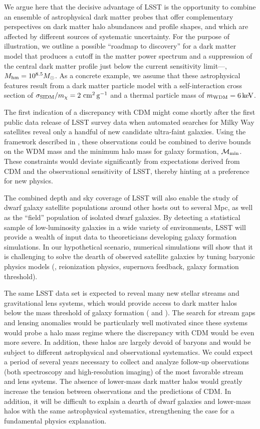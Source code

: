 We argue here that the decisive advantage of LSST is the opportunity to combine an ensemble of astrophysical dark matter probes that offer complementary perspectives on dark matter halo abundances and profile shapes, and which are affected by different sources of systematic uncertainty.
For the purpose of illustration, we outline a possible ``roadmap to discovery'' for a dark matter model that produces a cutoff in the matter power spectrum and a suppression of the central dark matter profile just below the current sensitivity limit---\ie, $M_{\rm hm} = 10^{8.5}M_\odot$.
As a concrete example, we assume that these astrophysical features result from a dark matter particle model with a self-interaction cross section of $\sigma_{\rm SIDM}/m_\chi = 2 \mathrm{\,\mathrm{\,cm}^2\mathrm{\,g}^{-1}}$ and a thermal particle mass of $m_{\rm WDM} = 6 \mathrm{\,keV}$.

The first indication of a discrepancy with CDM might come shortly after the first public data release of LSST survey data when automated searches for Milky Way satellites reveal only a handful of new candidate ultra-faint galaxies. 
Using the framework described in , these observations could be combined to derive bounds on the WDM mass and the minimum halo mass for galaxy formation, $\mathcal{M}_{\rm min}$. These constraints would deviate significantly from expectations derived from CDM and the observational sensitivity of LSST, thereby hinting at a preference for new physics.

The combined depth and sky coverage of LSST will also enable the study of dwarf galaxy satellite populations around other hosts out to several Mpc, as well as the ``field'' population of isolated dwarf galaxies.
By detecting a statistical sample of low-luminosity galaxies in a wide variety of environments, LSST will provide a wealth of input data to theoreticians developing galaxy formation simulations.
In our hypothetical scenario, numerical simulations will show that it is challenging to solve the dearth of observed satellite galaxies by tuning baryonic physics models (\eg, reionization physics, supernova feedback, galaxy formation threshold).

The same LSST data set is expected to reveal many new stellar streams and gravitational lens systems, which would provide access to dark matter halos below the mass threshold of galaxy formation ( and ).
The search for stream gaps and lensing anomalies would be particularly well motivated since these systems would probe a halo mass regime where the discrepancy with CDM would be even more severe.
In addition, these halos are largely devoid of baryons and would be subject to different astrophysical and observational systematics.
We could expect a period of several years necessary to collect and analyze follow-up observations (both spectroscopy and high-resolution imaging) of the most favorable stream and lens systems.
The absence of lower-mass dark matter halos would greatly increase the tension between observations and the predictions of CDM.
In addition, it will be difficult to explain a dearth of dwarf galaxies and lower-mass halos with the same astrophysical systematics, strengthening the case for a fundamental physics explanation.


